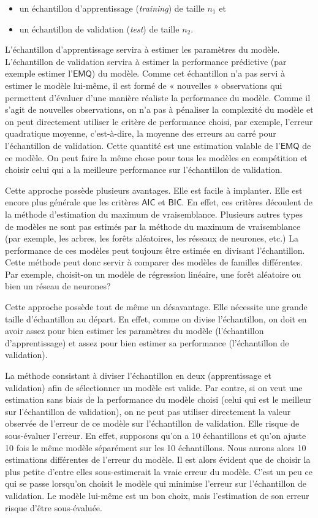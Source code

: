 \documentclass[
  11pt,
  letterpaper,
]{book}
\providecommand{\tightlist}{%
  \setlength{\itemsep}{0pt}\setlength{\parskip}{0pt}}
\theoremstyle{definition}
\theoremstyle{definition}
\theoremstyle{definition}
\theoremstyle{remark}
\begin{document}
\begin{itemize}
\tightlist
\item
  un échantillon d'apprentissage (\emph{training}) de taille \(n_1\) et
\item
  un échantillon de validation (\emph{test}) de taille \(n_2\).
\end{itemize}

L'échantillon d'apprentissage servira à estimer les paramètres du modèle. L'échantillon de validation servira à estimer la performance prédictive (par exemple estimer l'\(\mathsf{EMQ}\)) du modèle. Comme cet échantillon n'a pas servi à estimer le modèle lui-même, il est formé de « nouvelles » observations qui permettent d'évaluer d'une manière réaliste la performance du modèle. Comme il s'agit de nouvelles observations, on n'a pas à pénaliser la complexité du modèle et on peut directement utiliser le critère de performance choisi, par exemple, l'erreur quadratique moyenne, c'est-à-dire, la moyenne des erreurs au carré pour l'échantillon de validation. Cette quantité est une estimation valable de l'\(\mathsf{EMQ}\) de ce modèle. On peut faire la même chose pour tous les modèles en compétition et choisir celui qui a la meilleure performance sur l'échantillon de validation.

Cette approche possède plusieurs avantages. Elle est facile à implanter. Elle est encore plus générale que les critères \(\mathsf{AIC}\) et \(\mathsf{BIC}\). En effet, ces critères découlent de la méthode d'estimation du maximum de vraisemblance. Plusieurs autres types de modèles ne sont pas estimés par la méthode du maximum de vraisemblance (par exemple, les arbres, les forêts aléatoires, les réseaux de neurones, etc.) La performance de ces modèles peut toujours être estimée en divisant l'échantillon. Cette méthode peut donc servir à comparer des modèles de familles différentes. Par exemple, choisit-on un modèle de régression linéaire, une forêt aléatoire ou bien un réseau de neurones?

Cette approche possède tout de même un désavantage. Elle nécessite une grande taille d'échantillon au départ. En effet, comme on divise l'échantillon, on doit en avoir assez pour bien estimer les paramètres du modèle (l'échantillon d'apprentissage) et assez pour bien estimer sa performance (l'échantillon de validation).

La méthode consistant à diviser l'échantillon en deux (apprentissage et validation) afin de sélectionner un modèle est valide. Par contre, si on veut une estimation sans biais de la performance du modèle choisi (celui qui est le meilleur sur l'échantillon de validation), on ne peut pas utiliser directement la valeur observée de l'erreur de ce modèle sur l'échantillon de validation. Elle risque de sous-évaluer l'erreur. En effet, supposons qu'on a 10 échantillons et qu'on ajuste 10 fois le même modèle séparément sur les 10 échantillons. Nous aurons alors 10 estimations différentes de l'erreur du modèle. Il est alors évident que de choisir la plus petite d'entre elles sous-estimerait la vraie erreur du modèle. C'est un peu ce qui se passe lorsqu'on choisit le modèle qui minimise l'erreur sur l'échantillon de validation. Le modèle lui-même est un bon choix, mais l'estimation de son erreur risque d'être sous-évaluée.
\end{document}
